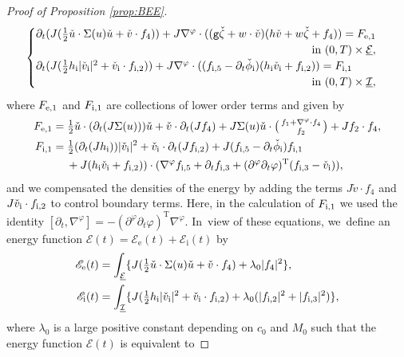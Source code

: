 \documentclass[10pt]{amsart}
\newcommand{\gr}{{\mathtt g}}
\newcommand{\dt}{\partial_t}
\newcommand{\cI}{{\mathcal I}}
\newcommand{\cE}{{\mathcal E}}
\newcommand{\ul}[1]{\underline{#1}}
\theoremstyle{definition}
\begin{document}
\begin{proof}[Proof of Proposition \ref{prop:BEE}]
\[\begin{cases}
\dt(J(\frac12\check{u}\cdot\Sigma(u)\check{u}+\check{v}\cdot f_4))
+ J\nabla^\varphi\cdot((\gr\check{\zeta}+w\cdot\check{v})(h\check{v}+w\check{\zeta}+f_4)) = F_{{\rm e},1} \\
\hfill \text{in } (0,T)\times\ul{\cE}, \\
\dt(J(\frac12h_\mathrm{i}|\check{v}_\mathrm{i}|^2 + \check{v}_\mathrm{i}\cdot f_{{\rm i},2}))
+ J\nabla^\varphi\cdot((f_{{\rm i},5}-\dt\check{\phi}_\mathrm{i})(h_\mathrm{i}\check{v}_\mathrm{i}+f_{{\rm i},2})) = F_{{\rm i},1} \\
\hfill \text{in } (0,T)\times\ul{\cI},
\end{cases}
\]
where $F_{{\rm e},1}$ and $F_{{\rm i},1}$ are collections of lower order terms and given by
\begin{align*}
F_{{\rm e},1}
&= \tfrac12\check{u}\cdot(\dt(J\Sigma(u)))\check{u} + \check{v}\cdot\dt(Jf_4)
+ J\Sigma(u)\check{u}\cdot\bigl(\begin{smallmatrix} f_1+\nabla^\varphi\cdot f_4 \\ f_2 \end{smallmatrix} \bigr) + Jf_2\cdot f_4, \\
F_{{\rm i},1}
&= \tfrac12(\dt(Jh_\mathrm{i}))|\check{v}_\mathrm{i}|^2 + \check{v}_\mathrm{i}\cdot\dt(Jf_{{\rm i},2})
+ J(f_{{\rm i},5}-\dt\check{\phi}_\mathrm{i})f_{{\rm i},1} \\
&\quad\;
+ J(h_\mathrm{i}\check{v}_\mathrm{i}+f_{{\rm i},2}))\cdot(\nabla^\varphi f_{{\rm i},5}+\dt f_{{\rm i},3}
+ (\partial^\varphi\dt\varphi)^\mathrm{T}(f_{{\rm i},3}-\check{v}_\mathrm{i})),
\end{align*}
and we compensated the densities of the energy by adding the terms $J\check{v}\cdot f_4$ and $J\check{v}_\mathrm{i}\cdot f_{{\rm i},2}$ to control boundary terms.
Here, in the calculation of $F_{{\rm i},1}$ we used the identity $[\dt,\nabla^\varphi]=-(\partial^\varphi\dt\varphi)^\mathrm{T}\nabla^\varphi$. In~view of these equations, we~define an energy function $\mathscr{E}(t)=\mathscr{E}_\mathrm{e}(t)+\mathscr{E}_\mathrm{i}(t)$ by
\begin{align*}
\mathscr{E}_\mathrm{e}(t)
&= \int_{\ul{\cE}}\{ J(\tfrac12\check{u}\cdot\Sigma(u)\check{u}+\check{v}\cdot f_4) + \lambda_0|f_4|^2 \}, \\
\mathscr{E}_\mathrm{i}(t)
&= \int_{\ul{\cI}}\{ J(\tfrac12h_\mathrm{i}|\check{v}_\mathrm{i}|^2 + \check{v}_\mathrm{i}\cdot f_{{\rm i},2}) + \lambda_0(|f_{{\rm i},2}|^2+|f_{{\rm i},3}|^2) \},
\end{align*}
where $\lambda_0$ is a large positive constant depending on $c_0$ and $M_0$ such that the energy function $\mathscr{E}(t)$ is equivalent to

\end{proof}
\end{document}
